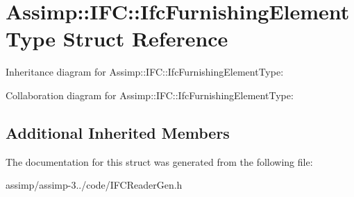 \hypertarget{struct_assimp_1_1_i_f_c_1_1_ifc_furnishing_element_type}{\section{Assimp\+:\+:I\+F\+C\+:\+:Ifc\+Furnishing\+Element\+Type Struct Reference}
\label{struct_assimp_1_1_i_f_c_1_1_ifc_furnishing_element_type}
}


Inheritance diagram for Assimp\+:\+:I\+F\+C\+:\+:Ifc\+Furnishing\+Element\+Type\+:


Collaboration diagram for Assimp\+:\+:I\+F\+C\+:\+:Ifc\+Furnishing\+Element\+Type\+:
\subsection*{Additional Inherited Members}


The documentation for this struct was generated from the following file\+:\begin{DoxyCompactItemize}
\item 
assimp/assimp-\/3../code/I\+F\+C\+Reader\+Gen.\+h\end{DoxyCompactItemize}
